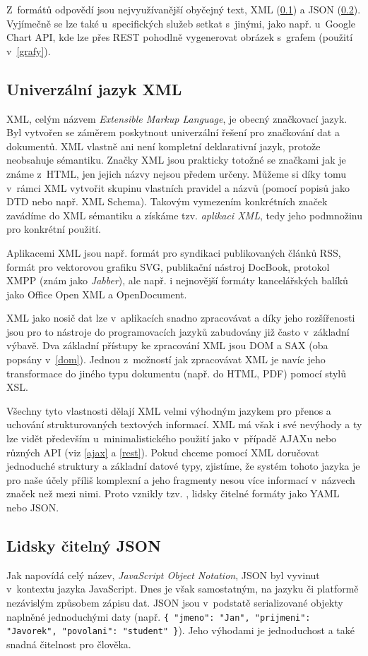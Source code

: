 Z~formátů odpovědí jsou nej\-využívanější obyčejný text, XML (\ref{xml})
a JSON (\ref{json}). Vyjímečně se lze také u~specifických služeb
setkat s~jinými, jako např. u~Google Chart API, kde lze přes REST
pohodlně vygenerovat obrázek s~grafem (použití v~\ref{grafy}).

\subsection{Univerzální jazyk XML}\label{xml}
XML, celým názvem {\it Extensible Markup Language}, je obecný
značkovací jazyk. Byl vytvořen se záměrem poskytnout univerzální
řešení pro značkování dat a dokumentů. XML vlastně ani není kompletní
deklarativní jazyk, protože neobsahuje sémantiku. Značky XML jsou
prakticky totožné se značkami jak je známe z~HTML, jen jejich názvy
nejsou předem určeny. Můžeme si díky tomu v~rámci XML vytvořit skupinu
vlastních pravidel a názvů (pomocí popisů jako DTD nebo např. XML
Schema). Takovým vymezením konkrétních značek zavádíme do XML sémantiku a
získáme tzv. {\it aplikaci XML}, tedy jeho podmnožinu pro konkrétní
použití.

Aplikacemi XML jsou např. formát pro syndikaci publikovaných článků
RSS, formát pro vektorovou grafiku SVG, publikační nástroj DocBook,
protokol XMPP (znám jako {\it Jabber}), ale např. i nej\-novější
formáty kancelářských balíků jako Office Open XML a OpenDocument.

XML jako nosič dat lze v~aplikacích snadno zpracovávat a díky jeho
rozšířenosti jsou pro to nástroje do programovacích jazyků zabudovány
již často v~základní výbavě. Dva základní přístupy ke
zpracování XML jsou DOM a SAX (oba popsány v~\ref{dom}). Jednou
z~možností jak zpracovávat XML je navíc jeho transformace do jiného typu
dokumentu (např. do HTML, PDF) pomocí stylů XSL.

Všechny tyto vlastnosti dělají XML velmi výhodným jazykem pro přenos
a uchování strukturovaných textových informací. XML má však i své
nevýhody a ty lze vidět především u~minimalistického použití jako
v~případě AJAXu nebo různých API (viz \ref{ajax} a \ref{rest}). Pokud
chceme pomocí XML doručovat jednoduché struktury a základní datové typy, zjistíme, že systém
tohoto jazyka je pro naše účely příliš komplexní a jeho fragmenty
nesou více informací v~názvech značek než mezi nimi. Proto vznikly
tzv. , lidsky čitelné formáty jako YAML nebo JSON.

\subsection{Lidsky čitelný JSON}\label{json}
Jak napovídá celý název, {\it JavaScript Object Notation}, JSON byl
vyvinut v~kontextu jazyka JavaScript. Dnes je však samostatným, na
jazyku či platformě nezávislým způsobem zápisu dat. JSON jsou
v~podstatě serializované objekty naplněné jednoduchými daty (např.
{\tt \{ "jmeno": "Jan", "prijmeni": "Javorek", "povolani": "student"
\}}). Jeho výhodami je jednoduchost a také snadná čitelnost pro člověka.

